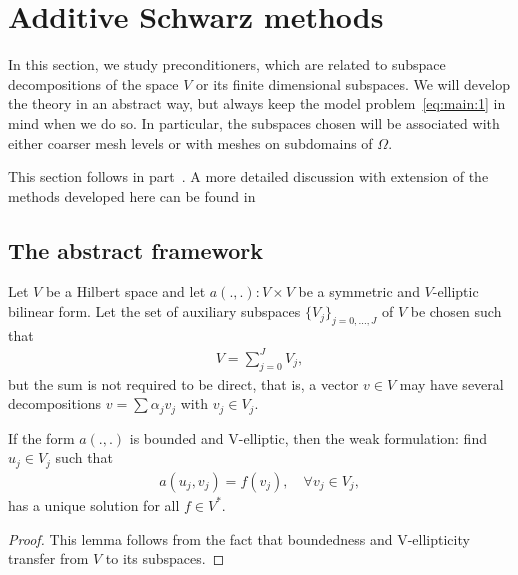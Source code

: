 
\section{Additive Schwarz methods}

\begin{intro}
  In this section, we study preconditioners, which are related to
  subspace decompositions of the space $V$ or its finite dimensional
  subspaces. We will develop the theory in an abstract way, but always
  keep the model problem~\eqref{eq:main:1} in mind when we do so. In
  particular, the subspaces chosen will be associated with either
  coarser mesh levels or with meshes on subdomains of $\Omega$.
  
  This section follows in part~\cite[Chapter 7]{BrennerScott02}. A
  more detailed discussion with extension of the methods developed
  here can be found in~\cite{ToselliWidlund05}
\end{intro}

\subsection{The abstract framework}

\begin{intro}
  Let $V$ be a Hilbert space and let $a(.,.): V\times V$ be a
  symmetric and $V$-elliptic bilinear form. Let the set of auxiliary
  subspaces $\{V_j\}_{j=0,\dots,J}$ of $V$ be chosen such that
  \begin{gather*}
    V = \sum_{j=0}^J V_j,
  \end{gather*}
  but the sum is not required to be direct, that is, a vector $v\in V$
  may have several decompositions $v = \sum \alpha_j v_j$ with $v_j\in
  V_j$.
\end{intro}

\begin{lemma}
  \label{lemma:schwarz:1}
  If the form $a(.,.)$ is bounded and V-elliptic, then the weak
  formulation: find $u_j\in V_j$ such that
  \begin{gather}
    \label{eq:schwarz:1}
    a(u_j,v_j) = f(v_j),
    \quad\forall v_j\in V_j,
  \end{gather}
  has a unique solution for all $f\in V^*$.
\end{lemma}

\begin{proof}
  This lemma follows from the fact that boundedness and V-ellipticity
  transfer from $V$ to its subspaces.
\end{proof}

